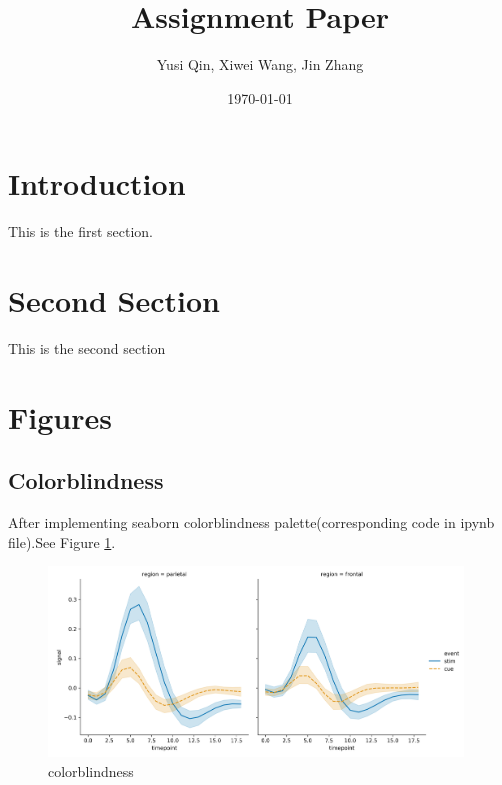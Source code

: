 \documentclass{article}
\title{Assignment Paper}
\author{Yusi Qin, Xiwei Wang, Jin Zhang}
\affil{University of Zurich}
\date{\today}
\begin{document}
\maketitle

\newpage
\tableofcontents

\newpage
\section{Introduction}

This is the first section.

\blindtext

\section{Second Section}
This is the second section

\blindtext

\newpage
\section{Figures}

\subsection{Colorblindness}
After implementing seaborn colorblindness palette(corresponding code in ipynb file).See Figure \ref{blind}.
\begin{figure}[htbp]
    \centering
    \includegraphics[width = 11cm]{colorblind.png}
    \caption{colorblindness}
    \label{blind}
\end{figure}
\end{document}
